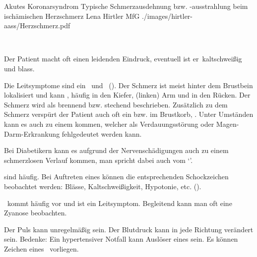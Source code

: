 \Picture
{Akutes Koronarsyndrom}%
{Typische Schmerzausdehnung bzw. -ausstrahlung beim ischämischen
Herzschmerz}%
{}%
{Lena Hirtler}%
{MfG}%
{./images/hirtler-aass/Herzschmerz.pdf}%
{}%
{}%


\TextSlide
{\TxABCDE}
{~
\begin{ABCDEText}
  \item[\ABCDE{3}]  Der Patient macht oft einen leidenden
  Eindruck, eventuell ist er {\RedFlag}\,kaltschweißig und blass.
  \item[\ABCDE{4}] Die Leitsymptome sind ein {\RedFlag}\, und {\RedFlag}\,
  ().
  Der Schmerz ist meist hinter dem Brustbein lokalisiert und
  kann , häufig in den Kiefer, (linken) Arm
  und in den Rücken. Der Schmerz wird als brennend bzw.
  stechend beschrieben. Zusätzlich zu dem Schmerz verspürt
  der Patient auch oft ein  bzw. 
  im Brustkorb, .
  Unter Umständen kann es auch zu einem
   kommen, welcher als
  Verdauungsstörung oder Magen-Darm-Erkrankung fehlgedeutet
  werden kann.
  
  Bei Diabetikern kann es aufgrund der Nervenschädigungen
  auch zu einem schmerzlosen Verlauf kommen, man spricht
  dabei auch vom \enquote*{}.
  
   sind
  häufig.
  Bei Auftreten eines  können die
  entsprechenden Schockzeichen beobachtet werden: Blässe,
  Kaltschweißigkeit, Hypotonie, etc.
  ().
  \item[\ABCDE{B}] {\RedFlag}\, kommt häufig vor und ist ein
  Leitsymptom.  Begleitend kann man oft eine Zyanose
  beobachten.
  \item[\ABCDE{C}] Der Puls kann unregelmäßig sein.   
  Der Blutdruck kann in jede Richtung
  verändert sein. Bedenke: Ein hypertensiver Notfall kann
  Auslöser eines  sein. Es
  können Zeichen eines {\RedFlag}\, vorliegen. 
  

\end{ABCDEText}}
